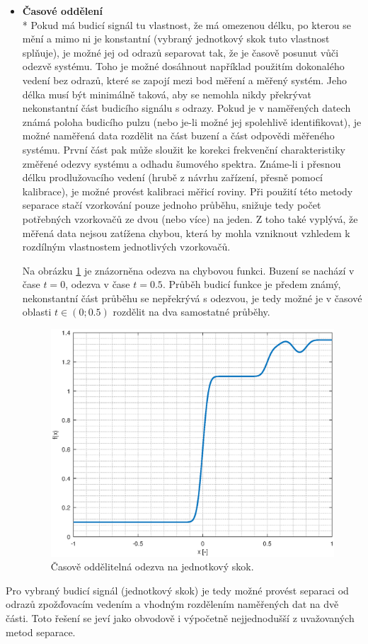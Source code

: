 \begin{itemize}
	\item
	\textbf{Časové oddělení}\\*	
	Pokud má budicí signál tu vlastnost, že má omezenou délku, po kterou se mění a mimo ni je konstantní (vybraný jednotkový skok tuto vlastnost splňuje), je možné jej od odrazů separovat tak, že je časově posunut vůči odezvě systému. Toho je možné dosáhnout například použitím dokonalého vedení bez odrazů, které se zapojí mezi bod měření a měřený systém. Jeho délka musí být minimálně taková, aby se nemohla nikdy překrývat nekonstantní část budicího signálu s odrazy. Pokud je v naměřených datech známá poloha budicího pulzu (nebo je-li možné jej spolehlivě identifikovat), je možné naměřená data rozdělit na část buzení a část odpovědi měřeného systému. První část pak může sloužit ke korekci frekvenční charakteristiky změřené odezvy systému a odhadu šumového spektra. Známe-li i přesnou délku prodlužovacího vedení (hrubě z návrhu zařízení, přesně pomocí kalibrace), je možné provést kalibraci měřicí roviny. Při použití této metody separace stačí vzorkování pouze jednoho průběhu, snižuje tedy počet potřebných vzorkovačů ze dvou (nebo více) na jeden. Z toho také vyplývá, že měřená data nejsou zatížena chybou, která by mohla vzniknout vzhledem k rozdílným vlastnostem jednotlivých vzorkovačů.
	
	Na obrázku \ref{separableunitstep} je znázorněna odezva na chybovou funkci. Buzení se nachází v čase $t=0$, odezva v čase $t=0.5$. Průběh budicí funkce je předem známý, nekonstantní část průběhu se nepřekrývá s odezvou, je tedy možné je v časové oblasti $t\in (0;0.5)$ rozdělit na dva samostatné průběhy.

\begin{figure}[htbp]\includegraphics[width=\textwidth,keepaspectratio]{images/separableunitstep.eps}\caption{Časově oddělitelná odezva na jednotkový skok.}\label{separableunitstep}\end{figure}	
\end{itemize}

Pro vybraný budicí signál (jednotkový skok) je tedy možné provést separaci od odrazů zpožďovacím vedením a vhodným rozdělením naměřených dat na dvě části. Toto řešení se jeví jako obvodově i výpočetně nejjednodušší z uvažovaných metod separace.